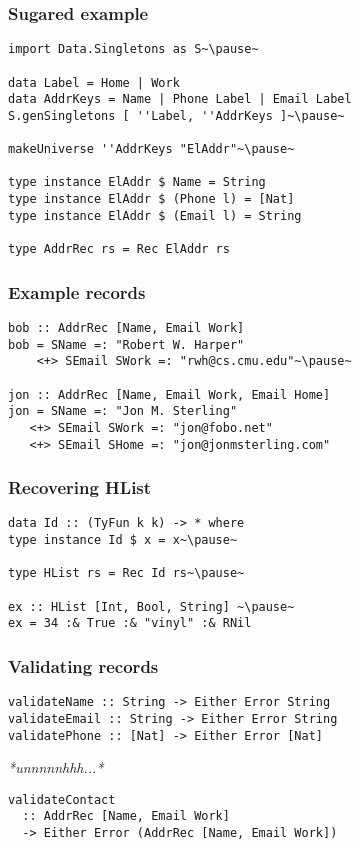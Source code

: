 \documentclass[tikz, 12pt]{beamer}
\begin{document}
\begin{frame}[fragile]
  \frametitle{Sugared example}
  \begin{lstlisting}
import Data.Singletons as S~\pause~

data Label = Home | Work
data AddrKeys = Name | Phone Label | Email Label
S.genSingletons [ ''Label, ''AddrKeys ]~\pause~

makeUniverse ''AddrKeys "ElAddr"~\pause~

type instance ElAddr $ Name = String
type instance ElAddr $ (Phone l) = [Nat]
type instance ElAddr $ (Email l) = String

type AddrRec rs = Rec ElAddr rs
  \end{lstlisting}
\end{frame}

\begin{frame}[fragile]
  \frametitle{Example records}
  \begin{lstlisting}
bob :: AddrRec [Name, Email Work]
bob = SName =: "Robert W. Harper"
    <+> SEmail SWork =: "rwh@cs.cmu.edu"~\pause~

jon :: AddrRec [Name, Email Work, Email Home]
jon = SName =: "Jon M. Sterling"
   <+> SEmail SWork =: "jon@fobo.net"
   <+> SEmail SHome =: "jon@jonmsterling.com"
  \end{lstlisting}
\end{frame}

\begin{frame}[fragile]
  \frametitle{Recovering HList}\pause
  \begin{lstlisting}
data Id :: (TyFun k k) -> * where
type instance Id $ x = x~\pause~

type HList rs = Rec Id rs~\pause~

ex :: HList [Int, Bool, String] ~\pause~
ex = 34 :& True :& "vinyl" :& RNil
  \end{lstlisting}
\end{frame}

\begin{frame}[fragile]
  \frametitle{Validating records}
  \begin{lstlisting}
validateName :: String -> Either Error String
validateEmail :: String -> Either Error String
validatePhone :: [Nat] -> Either Error [Nat]
  \end{lstlisting}
  \pause
  \centerline{\textit{*unnnnnhhh...*}}
  \pause
  \begin{lstlisting}
validateContact
  :: AddrRec [Name, Email Work]
  -> Either Error (AddrRec [Name, Email Work])
  \end{lstlisting}
\end{frame}
\end{document}
